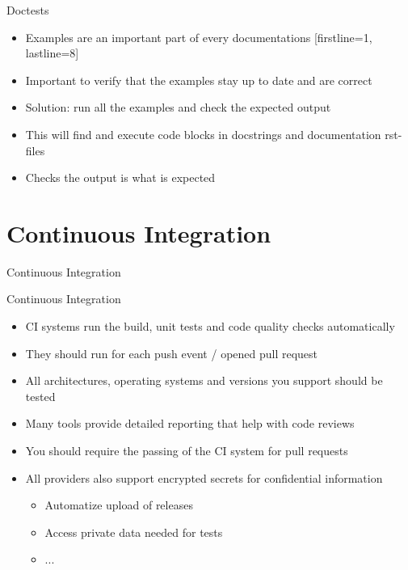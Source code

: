 \documentclass[
  aspectratio=1610,
]{beamer}
\newcommand\headlineframe[1]{%
  \begin{frame}[c]%
    \begin{center}%
      \Huge\color{vertexDarkRed}#1%
    \end{center}%
  \end{frame}%
}%
\begin{document}
\begin{frame}[c, fragile]{Doctests}
  \begin{itemize}
    \item Examples are an important part of every documentations
      [firstline=1, lastline=8]
    \item Important to verify that the examples stay up to date and are correct
    \item Solution: run all the examples and check the expected output
    \item This will find and execute code blocks in docstrings and documentation rst-files
    \item Checks the output is what is expected
  \end{itemize}
\end{frame}

\section{Continuous Integration}
\headlineframe{Continuous Integration}
\begin{frame}[c]{Continuous Integration}
  \begin{itemize}
    \item CI systems run the build, unit tests and code quality checks automatically
    \item They should run for each push event / opened pull request
    \item All architectures, operating systems and versions you support should be tested
    \item Many tools provide detailed reporting that help with code reviews
    \item You should require the passing of the CI system for pull requests
    \item All providers also support encrypted secrets for confidential information\\
      \begin{itemize}
        \item Automatize upload of releases
        \item Access private data needed for tests
        \item ...
      \end{itemize}
  \end{itemize}
\end{frame}
\end{document}
